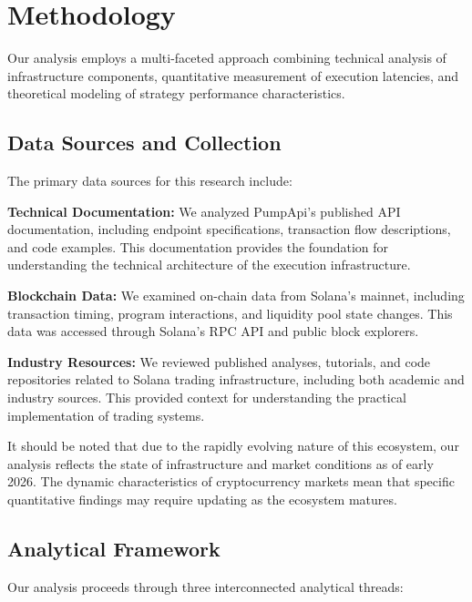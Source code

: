 \documentclass[12pt,a4paper]{article}
\begin{document}
\section{Methodology}

Our analysis employs a multi-faceted approach combining technical analysis of infrastructure components, quantitative measurement of execution latencies, and theoretical modeling of strategy performance characteristics.

\subsection{Data Sources and Collection}

The primary data sources for this research include:

\textbf{Technical Documentation:} We analyzed PumpApi's published API documentation, including endpoint specifications, transaction flow descriptions, and code examples. This documentation provides the foundation for understanding the technical architecture of the execution infrastructure.

\textbf{Blockchain Data:} We examined on-chain data from Solana's mainnet, including transaction timing, program interactions, and liquidity pool state changes. This data was accessed through Solana's RPC API and public block explorers.

\textbf{Industry Resources:} We reviewed published analyses, tutorials, and code repositories related to Solana trading infrastructure, including both academic and industry sources. This provided context for understanding the practical implementation of trading systems.

It should be noted that due to the rapidly evolving nature of this ecosystem, our analysis reflects the state of infrastructure and market conditions as of early 2026. The dynamic characteristics of cryptocurrency markets mean that specific quantitative findings may require updating as the ecosystem matures.

\subsection{Analytical Framework}

Our analysis proceeds through three interconnected analytical threads:
\end{document}
